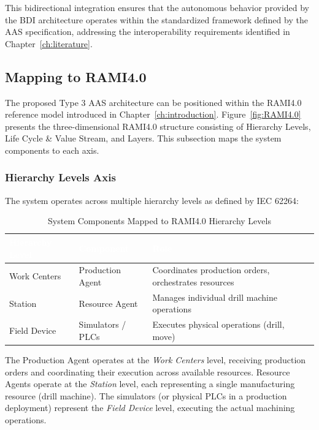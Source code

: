 This bidirectional integration ensures that the autonomous behavior provided by the \ac{BDI} architecture operates within the standardized framework defined by the \ac{AAS} specification, addressing the interoperability requirements identified in Chapter~\ref{ch:literature}.

\subsection{Mapping to RAMI4.0}
\label{subsec:rami40_mapping}

The proposed Type 3 \ac{AAS} architecture can be positioned within the \ac{RAMI4.0} reference model introduced in Chapter~\ref{ch:introduction}. Figure~\ref{fig:RAMI4.0} presents the three-dimensional RAMI4.0 structure consisting of Hierarchy Levels, Life Cycle \& Value Stream, and Layers. This subsection maps the system components to each axis.

\subsubsection{Hierarchy Levels Axis}

The system operates across multiple hierarchy levels as defined by IEC 62264:

\begin{table}[ht]
\centering
\caption{System Components Mapped to RAMI4.0 Hierarchy Levels}
\label{tab:rami_hierarchy}
\begin{tabular}{p{}p{}p{}}
\toprule
\rowcolor{headerblue}
\textcolor{white}{Hierarchy Level} & \textcolor{white}{Component} & \textcolor{white}{Role} \\
\midrule
Work Centers & Production Agent & Coordinates production orders, orchestrates resources \\
\rowcolor{lightgray}
Station & Resource Agent & Manages individual drill machine operations \\
Field Device & Simulators / PLCs & Executes physical operations (drill, move) \\
\bottomrule
\end{tabular}
\end{table}

The Production Agent operates at the \textit{Work Centers} level, receiving production orders and coordinating their execution across available resources. Resource Agents operate at the \textit{Station} level, each representing a single manufacturing resource (drill machine). The simulators (or physical PLCs in a production deployment) represent the \textit{Field Device} level, executing the actual machining operations.

